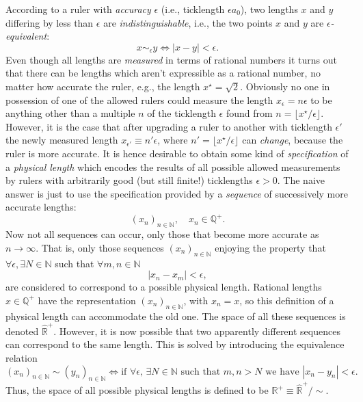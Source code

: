 \documentclass[11pt]{amsart}
\theoremstyle{plain}%
\theoremstyle{definition}
\theoremstyle{remark}
\begin{document}
According to a ruler with \emph{accuracy} $\epsilon$ (i.e., ticklength $\epsilon a_0$), two lengths $x$ and $y$ differing by less than $\epsilon$ are \emph{indistinguishable}, i.e., the two points $x$ and $y$ are \emph{$\epsilon$-equivalent}:
\begin{equation}
	x\sim_\epsilon y \Leftrightarrow |x-y| < \epsilon. 
\end{equation} 
Even though all lengths are \emph{measured} in terms of rational numbers it turns out that there can be lengths which aren't expressible as a rational number, no matter how accurate the ruler, e.g., the length $x^\star = \sqrt{2}$. Obviously no one in possession of one of the allowed rulers could measure the length $x_{\epsilon} = n\epsilon$ to be anything other than a multiple $n$ of the ticklength $\epsilon$ found from $n = \lfloor x^\star/\epsilon \rfloor$. However, it is the case that after upgrading a ruler to another with ticklength $\epsilon'$ the newly measured length $x_{\epsilon'} \equiv n'\epsilon$, where $n' = \lfloor x^\star/\epsilon \rfloor$ can \emph{change}, because the ruler is more accurate. It is hence desirable to obtain some kind of \emph{specification} of a \emph{physical length} which encodes the results of all possible allowed measurements by rulers with arbitrarily good (but still finite!) ticklengths $\epsilon > 0$. The naive answer is just to use the specification provided by a \emph{sequence} of successively more accurate lengths:
\begin{equation}
	(x_n)_{n \in \mathbb{N}}, \quad x_n\in \mathbb{Q}^+.
\end{equation}
Now not all sequences can occur, only those that become more accurate as $n \rightarrow \infty$. That is, only those sequences $(x_n)_{n \in \mathbb{N}}$ enjoying the property that $\forall \epsilon, \exists N\in \mathbb{N}$ such that $\forall m,n\in \mathbb{N}$
\begin{equation}
	|x_n-x_m| < \epsilon,
\end{equation} 
are considered to correspond to a possible physical length. Rational lengths $x\in \mathbb{Q}^+$ have the representation $(x_n)_{n\in \mathbb{N}}$, with $x_n = x$, so this definition of a physical length can accommodate the old one. The space of all these sequences is denoted $\widehat{\mathbb{R}}^+$. However, it is now possible that two apparently different sequences can correspond to the same length. This is solved by introducing the equivalence relation 
\begin{equation}
	(x_n)_{n \in \mathbb{N}} \sim (y_n)_{n \in \mathbb{N}} \Leftrightarrow \text{if $\forall \epsilon$, $\exists N\in \mathbb{N}$ such that $m,n>N$ we have $|x_n-y_n| < \epsilon$.} 
\end{equation}
Thus, the space of all possible physical lengths is defined to be $\mathbb{R}^+ \equiv \widehat{\mathbb{R}}^+/\sim$.
\end{document}
